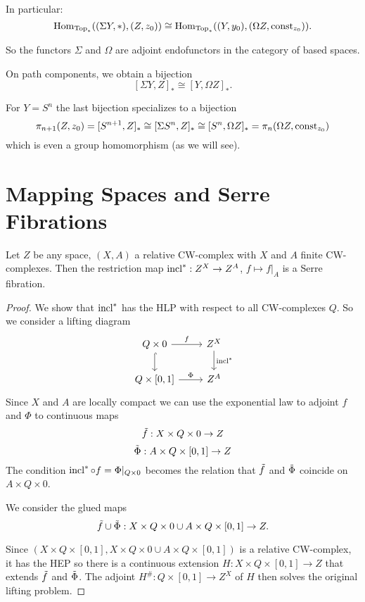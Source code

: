 In particular:
\[\operatorname{Hom}_{{\mathrm{Top}}_*}((\Sigma Y,*),(Z,z_0))\cong\operatorname{Hom}_{{\mathrm{Top}}_*}((Y,y_0),(\Omega Z,\operatorname{const}_{z_0})).\]

So the functors $\Sigma$ and $\Omega$ are adjoint endofunctors in the category of based spaces.

On path components, we obtain a bijection
\[[\Sigma Y,Z]_*\cong[Y,\Omega Z]_*.\]

For $Y=S^n$ the last bijection specializes to a bijection
\[\pi_{n+1}(Z,z_0)=[S^{n+1},Z]_*\cong[\Sigma S^n,Z]_*\cong[S^n,\Omega Z]_*=\pi_n(\Omega Z,\operatorname{const}_{z_0})\]
which is even a group homomorphism (as we will see).

\section{Mapping Spaces and Serre Fibrations}

\begin{theorem}
Let $Z$ be any space, $(X,A)$ a relative CW-complex with $X$ and $A$ finite CW-complexes. Then the restriction map $\operatorname{incl}^*:Z^X\to Z^A$, $f\mapsto f|_A$ is a Serre fibration.
\end{theorem}

\begin{proof}
We show that $\operatorname{incl}^*$ has the HLP with respect to all CW-complexes $Q$. So we consider a lifting diagram
\[\begin{tikzcd}
Q\times0 \arrow[d,hook] \arrow[r,"f"] & Z^X \arrow[d,"\incl^*"] \\
Q\times[0,1] \arrow[r,"\Phi"] & Z^A
\end{tikzcd}\]
Since $X$ and $A$ are locally compact we can use the exponential law to adjoint $f$ and $\Phi$ to continuous maps
\[\tilde f:X\times Q\times0\to Z\]
\[\tilde\Phi:A\times Q\times[0,1]\to Z\]
The condition $\operatorname{incl}^*\circ f=\Phi|_{Q\times0}$ becomes the relation that $\tilde f$ and $\tilde\Phi$ coincide on $A\times Q\times0$.

We consider the glued maps
\[\tilde f\cup\tilde\Phi:X\times Q\times 0\cup A\times Q\times[0,1]\to Z.\]

Since $(X\times Q \times [0,1],X\times Q\times 0\cup A\times Q\times[0,1])$ is a relative CW-complex, it has the HEP so there is a continuous extension $H:X\times Q\times[0,1]\to Z$ that extends $\tilde f$ and $\tilde\Phi$. The adjoint $H^\#:Q\times[0,1]\to Z^X$ of $H$ then solves the original lifting problem.
\end{proof}


